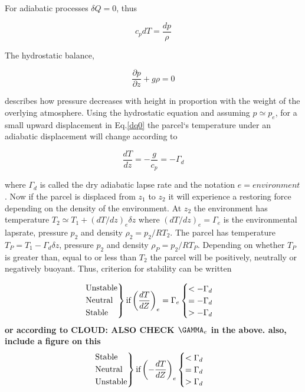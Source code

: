 For adiabatic processes $\delta Q = 0$, thus

\begin{equation}
    c_pdT = \frac{dp}{\rho}
    \label{dq0}
\end{equation}

The hydrostatic balance,

\begin{equation}
    \frac{\partial p}{\partial z} +g\rho = 0
\end{equation}

describes how pressure decreases with height in proportion with the weight of the overlying atmosphere. Using the hydrostatic equation and assuming $p \simeq p_{e}$, for a small upward displacement in Eq.\eqref{dq0} the parcel`s temperature under an adiabatic displacement will change according to

\begin{equation}
    \frac{dT}{dz} = -\frac{g}{c_p} = - \Gamma_d
    \label{drylaps}
\end{equation}

where $\Gamma_d$ is called the dry adiabatic lapse rate and the notation $e = environment$. Now if the parcel is displaced from $z_1$ to $z_2$ it will experience a restoring force depending on the density of the environment. At $z_2$ the environment has temperature $T_2 \simeq T_1 + (dT/dz)_e \delta z$ where $(dT/dz)_e = \Gamma_e$ is the environmental lapsrate, pressure $p_2$ and density $\rho_2 = p_2/RT_2$. The parcel has temperature $T_P = T_1 - \Gamma_d\delta z$, pressure $p_2$ and density $\rho_P = p_2/RT_P$. Depending on whether $T_P$ is greater than, equal to or less than $T_2$ the parcel will be positively, neutrally or negatively buoyant. Thus, criterion for stability can be written

\begin{equation}
    \begin{rcases}
      \text{Unstable}\\
      \text{Neutral}\\
      \text{Stable}
    \end{rcases}   
    \text{if} \left(\frac{dT}{dZ}\right)_e = \Gamma_e 
    \begin{cases}
      < - \Gamma_d \\
      = - \Gamma_d \\
      > - \Gamma_d
    \end{cases}
    \label{stabcond}
\end{equation}
\textbf{or according to CLOUD: ALSO CHECK $\GAMMA_e$ in the above. also, include a figure on this}
\begin{equation}
    \begin{rcases}
      \text{Stable}\\
      \text{Neutral}\\
      \text{Unstable}
    \end{rcases}   
    \text{if} \left(-\frac{dT}{dZ}\right)_e 
    \begin{cases}
      < \Gamma_d \\
      = \Gamma_d \\
      > \Gamma_d
    \end{cases}
\end{equation}

